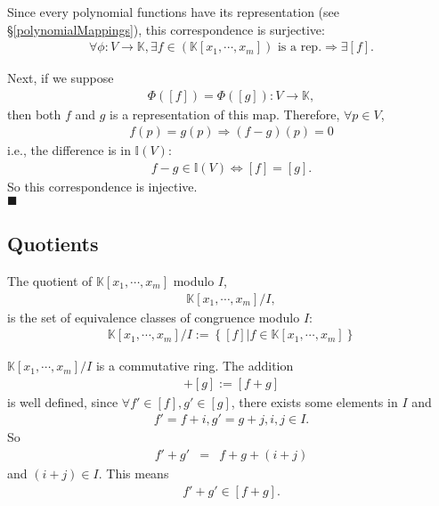 \documentclass[11pt]{book}
\begin{document}
Since every polynomial functions have its representation (see \S\ref{polynomialMappings}), this correspondence is surjective:
\begin{eqnarray}
\forall \phi : V \to \mathbb{K}, \exists f \in \left( \mathbb{K}[x_1, \cdots, x_m] \right) \text{ is a rep.} \Rightarrow \exists [f].
\end{eqnarray}

Next, if we suppose
\begin{eqnarray}
\Phi([f]) = \Phi([g]) : V \to \mathbb{K},
\end{eqnarray}
then both $f$ and $g$ is a representation of this map.
Therefore, $\forall p \in V$,
\begin{eqnarray}
f(p) = g(p) \Rightarrow (f-g)(p) = 0
\end{eqnarray}
i.e., the difference is in $\mathbb{I}(V)$:
\begin{eqnarray}
f-g \in \mathbb{I}(V) \Leftrightarrow [f] = [g].
\end{eqnarray}
So this correspondence is injective.\\
$\blacksquare$

\subsection{Quotients}
\label{Quotients}
The quotient of $\mathbb{K}[x_1, \cdots, x_m]$ modulo $I$,
\begin{eqnarray}
\mathbb{K}[x_1, \cdots, x_m] / I,
\end{eqnarray}
is the set of equivalence classes of congruence modulo $I$:
 \begin{eqnarray}
\mathbb{K}[x_1, \cdots, x_m] / I := \left\{ [f] \left| f \in \mathbb{K}[x_1, \cdots, x_m] \right. \right\}
\end{eqnarray}

$\mathbb{K}[x_1, \cdots, x_m] / I $ is a commutative ring.
The addition
\begin{eqnarray}
[f] + [g] := [f+g]
\end{eqnarray}
is well defined, since $\forall f' \in [f], g' \in [g]$, there exists some elements in $I$ and
\begin{eqnarray}
f' = f + i, g' = g + j, i,j \in I.
\end{eqnarray}
So
\begin{eqnarray}
f' + g' &=& f + g + (i+j)
\end{eqnarray}
and $(i+j) \in I$.
This means
\begin{eqnarray}
f' + g' \in [f+g].
\end{eqnarray}
\end{document}
